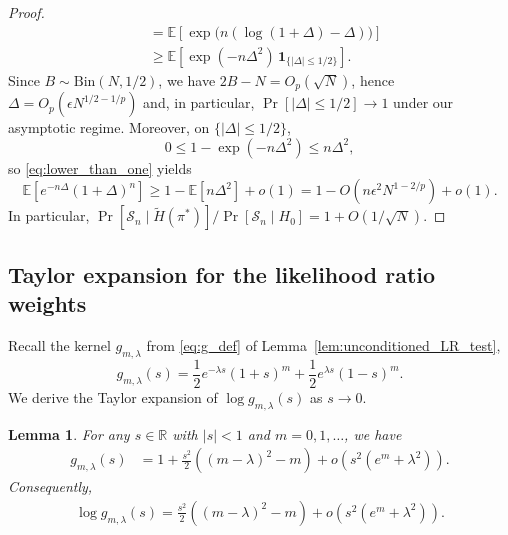 \documentclass[11pt]{article}
\newtheorem{lem}[thm]{Lemma}
\numberwithin{equation}{section}
\newcommand{\Bin}{\mathrm{Bin}}
\newcommand{\Scal}{\mathcal{S}}
\newcommand{\Prp}[1]{\Pr\left[#1 \right]}
\newcommand{\reals}{\mathbb R}
\newcommand{\one}{\mathbf{1}}
\newcommand{\ex}[1]{\ensuremath{\mathbb{E}\left[ #1\right]}}
\begin{document}
\begin{proof}
\begin{align}
&= \ex{\exp\big(n(\log(1+\Delta)-\Delta)\big)} \nonumber \\
&\geq \ex{\exp(-n\Delta^2)\,\one_{\{|\Delta|\leq 1/2\}} }.
\label{eq:lower_than_one}
\end{align}
Since $B\sim\Bin(N,1/2)$, we have $2B-N = O_{p}(\sqrt{N})$, hence $\Delta = O_{p}(\epsilon N^{1/2-1/p})$ and, in particular, $\Prp{|\Delta|\leq 1/2}\to 1$ under our asymptotic regime. Moreover, on $\{|\Delta|\leq 1/2\}$,
\[
0\leq 1-\exp(-n\Delta^2) \leq n\Delta^2,
\]
so \eqref{eq:lower_than_one} yields
\[
\ex{ e^{-n\Delta}\left(1+\Delta\right)^n } \geq 1 - \ex{n\Delta^2} + o(1) = 1 - O\!\left(n\epsilon^2 N^{1-2/p}\right) + o(1).
\]
In particular, $\Prp{\Scal_n \mid \tilde{H}(\pi^*)}/\Prp{\Scal_n \mid H_0} = 1+O(1/\sqrt{N})$.
\end{proof}

\subsection{Taylor expansion for the likelihood ratio weights}
\label{sec:taylor_expansion}

Recall the kernel $g_{m,\lambda}$ from \eqref{eq:g_def} of Lemma~\ref{lem:unconditioned_LR_test},
\[
g_{m,\lambda}(s) = \frac{1}{2}e^{-\lambda s} \left( 1 + s \right)^{m} + \frac{1}{2}e^{\lambda s} \left( 1 - s \right)^{m}.
\]
We derive the Taylor expansion of $\log g_{m,\lambda}(s)$ as $s \to 0$.

\begin{lem}
\label{lem:taylor_expansion}
For any $s \in \reals$ with $|s| < 1$ and $m=0,1,\ldots$, we have
\begin{align}
\label{eq:taylor_f}
    g_{m,\lambda}(s) & = 1 + \frac{s^2}{2}\left( (m-\lambda)^2 - m \right) + o\!\left(s^2(e^m + \lambda^2)\right).
\end{align}
Consequently,
\begin{align}
\label{eq:taylor_log_f}
\log g_{m,\lambda}(s) = \frac{s^2}{2}\left( (m-\lambda)^2 - m \right)+o\!\left(s^2 (e^m + \lambda^2)\right).
\end{align}
\end{lem}
\end{document}
